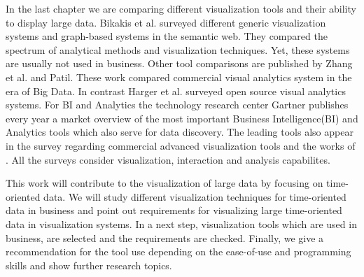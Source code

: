 \par
In the last chapter we are comparing different visualization tools and their ability to display large data.  Bikakis et al. surveyed different generic visualization systems and graph-based systems in the semantic web\cite{Bikakis2016}. They compared the spectrum of analytical methods and visualization techniques. Yet, these systems are usually not used in business. 
Other tool comparisons are published by Zhang et al.\cite{Zhanga} and Patil\cite{Patil}. These work compared commercial visual analytics system in the era of Big Data. In contrast Harger et al. surveyed open source visual analytics systems\cite{Harger}. For BI and Analytics the technology research center Gartner publishes every year a market overview of the most important Business Intelligence(BI) and Analytics tools which also serve for data discovery. The leading tools also appear in the survey\cite{Evelson2012} regarding commercial advanced visualization tools and the works of \cite{Zhanga}. All the surveys consider visualization, interaction and analysis capabilites.  
\par
This work will contribute to the visualization of large data by focusing on time-oriented data. We will study different visualization techniques for time-oriented data in business and point out requirements for visualizing large time-oriented data in visualization systems. In a next step, visualization tools which are used in business, are selected and the requirements are checked. Finally, we give a recommendation for the tool use depending on the ease-of-use and programming skills and show further research topics.